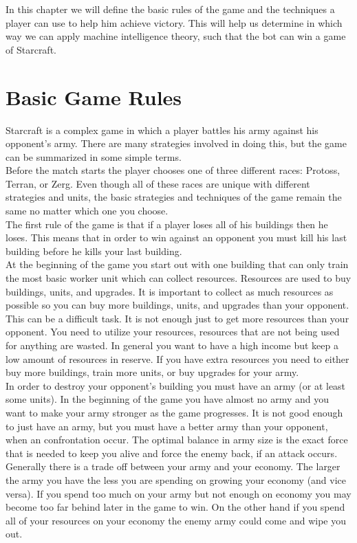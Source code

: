 In this chapter we will define the basic rules of the game and the techniques a player can use to help him achieve victory.
This will help us determine in which way we can apply machine intelligence theory, such that the bot can win a game of Starcraft. 

\section{Basic Game Rules}
	Starcraft is a complex game in which a player battles his army against his opponent's army. 
	There are many strategies involved in doing this, but the game can be summarized in some simple terms.\\
	Before the match starts the player chooses one of three different races: Protoss, Terran, or Zerg. 
	Even though all of these races are unique with different strategies and units, 
	the basic strategies and techniques of the game remain the same no matter which one you choose.\\	
	The first rule of the game is that if a player loses all of his buildings then he loses. 
	This means that in order to win against an opponent you must kill his last building before he kills your last building. \\	
	At the beginning of the game you start out with one building that can only train the most basic worker unit which can collect resources. 
	Resources are used to buy buildings, units, and upgrades. 
	It is important to collect  as much resources as possible so you can buy more buildings, units, and upgrades than your opponent.
	This can be a difficult task. It is not enough just to get more resources than your opponent. 
	You need to utilize your resources, resources that are not being used for anything are wasted. 
	In general you want to have a high income but keep a low amount of resources in reserve. 
	If you have extra resources you need to either buy more buildings, train more units, or buy upgrades for your army.\\
	In order to destroy your opponent's building you must have an army (or at least some units). 
	In the beginning of the game you have almost no army and you want to make your army stronger as the game progresses. 
	It is not good enough to just have an army, but you must have a better army than your opponent, when an confrontation occur.
	The optimal balance in army size is the exact force that is needed to keep you alive and force the enemy back, if an attack occurs.\\	
	Generally there is a trade off between your army and your economy. 
	The larger the army you have the less you are spending on growing your economy (and vice versa). 
	If you spend too much on your army but not enough on economy you may become too far behind later in the game to win. 
	On the other hand if you spend all of your resources on your economy the enemy army could come and wipe you out.\\

 